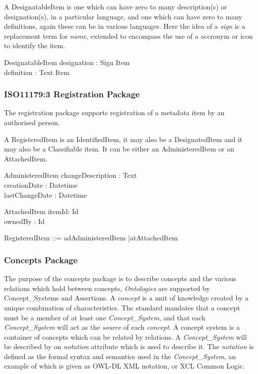 \documentclass{llncs}
\begin{document}
A DesignatableItem is one which can have zero to many description(s) or designation(s), in a particular language, and one which can have zero to many definitions, again these can be in various languages. Here the idea of a \emph{sign} is a replacement term for \emph{name}, extended to encompass the use of a accronym or icon to identify the item.
\begin{schema}{DesignatableItem}
  designation : Sign \pfun Item \\
  definition : Text \pfun Item \\
\end{schema}



\subsubsection{ISO11179:3 Registration Package}

The registration package supports registration of a metadata item by an authorised person. 

A RegisteredItem is an IdentifiedItem, it may also be a DesignatedItem and it may also be a Classifiable item. It can be either an AdministeredItem or an AttachedItem.


\begin{zed}
[LanguageTag]
\end{zed}
\begin{schema}{AdministeredItem}
changeDescription : Text \\
creationDate : Datetime \\
lastChangeDate : Datetime\\

\end{schema}

\begin{schema}{AttachedItem}
itemId: Id \\
ownedBy : Id
\end{schema}
 
\begin{zed}
RegisteredItem ::=  ad\ldata AdministeredItem \rdata |at\ldata AttachedItem \rdata
\end{zed}


\subsubsection{Concepts Package}
The purpose of the concepts package is to describe concepts and the various relations which hold between concepts, \emph{Ontologies} are supported by Concept\_Systems and Assertions. A \emph{concept} is a unit of knowledge created by a unique combination of characteristics. The standard mandates that a concept must be a member of at least one \emph{Concept\_System}, and that each \emph{Concept\_System} will act as the \emph{source} of each \emph{concept}. A concept system is a container of concepts which can be related by relations. A \emph{Concept\_System} will be described by on \emph{notation} attribute which is used to describe it. The \emph{notation} is defined as the formal syntax and semantics used in the  \emph{Concept\_System}, an example of which is given as OWL-DL XML notation, or XCL Common Logic.
\end{document}
